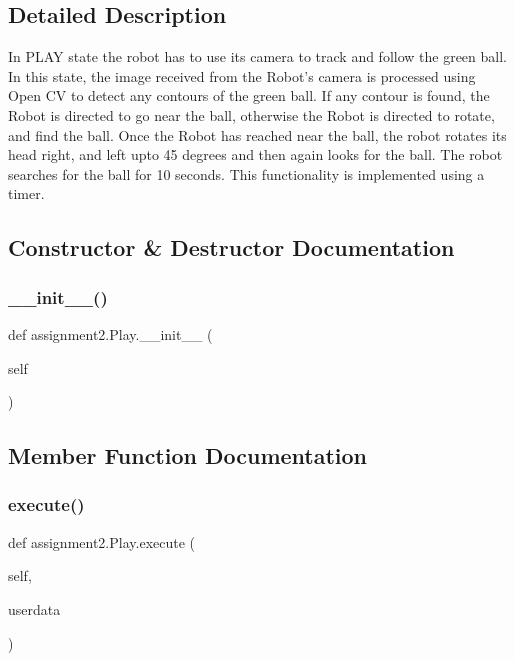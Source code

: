 \subsection{Detailed Description}
\begin{DoxyVerb}In PLAY state the robot has to use its camera to track and follow the green ball.
In this state, the image received from the Robot's camera is processed using Open CV to detect any contours of the green ball.
If any contour is found, the Robot is directed to go near the ball, otherwise the Robot is directed to rotate, and find the ball.
Once the Robot has reached near the ball, the robot rotates its head right, and left upto 45 degrees and then again looks for the ball.
The robot searches for the ball for 10 seconds. This functionality is implemented using a timer.
\end{DoxyVerb}
 

\subsection{Constructor \& Destructor Documentation}
\mbox{\label{classassignment2_1_1_play_a12f719c9d73f152f74d0176b31c5602e}} 
\subsubsection{\+\_\+\+\_\+init\+\_\+\+\_\+()}
{\footnotesize\ttfamily def assignment2.\+Play.\+\_\+\+\_\+init\+\_\+\+\_\+ (\begin{DoxyParamCaption}\item[{}]{self }\end{DoxyParamCaption})}



\subsection{Member Function Documentation}
\mbox{\label{classassignment2_1_1_play_acb448118e63c6175d8374b3fa5f996fa}} 
\subsubsection{execute()}
{\footnotesize\ttfamily def assignment2.\+Play.\+execute (\begin{DoxyParamCaption}\item[{}]{self,  }\item[{}]{userdata }\end{DoxyParamCaption})}



